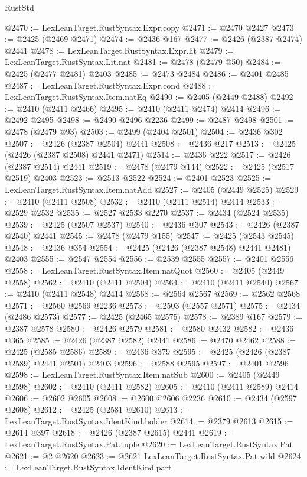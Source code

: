 \begin{lexlean}{RustStd}
\begin{coremodule}
@2470 := LexLeanTarget.RustSyntax.Expr.copy
@2471 := @2470 @2427
@2473 := @2425 (@2469 @2471)
@2474 := @2436 @167
@2477 := @2426 (@2387 @2474) @2441
@2478 := LexLeanTarget.RustSyntax.Expr.lit
@2479 := LexLeanTarget.RustSyntax.Lit.nat
@2481 := @2478 (@2479 @50)
@2484 := @2425 (@2477 @2481) @2403
@2485 := @2473 @2484
@2486 := @2401 @2485
@2487 := LexLeanTarget.RustSyntax.Expr.cond
@2488 := LexLeanTarget.RustSyntax.Item.natEq
@2490 := @2405 (@2449 @2488)
@2492 := @2410 (@2411 @2466)
@2495 := @2410 (@2411 @2474) @2414
@2496 := @2492 @2495
@2498 := @2490 @2496 @2236
@2499 := @2487 @2498
@2501 := @2478 (@2479 @93)
@2503 := @2499 (@2404 @2501)
@2504 := @2436 @302
@2507 := @2426 (@2387 @2504) @2441
@2508 := @2436 @217
@2513 := @2425 (@2426 (@2387 @2508) @2441 @2471)
@2514 := @2436 @222
@2517 := @2426 (@2387 @2514) @2441
@2519 := @2478 (@2479 @144)
@2522 := @2425 (@2517 @2519) @2403
@2523 := @2513 @2522
@2524 := @2401 @2523
@2525 := LexLeanTarget.RustSyntax.Item.natAdd
@2527 := @2405 (@2449 @2525)
@2529 := @2410 (@2411 @2508)
@2532 := @2410 (@2411 @2514) @2414
@2533 := @2529 @2532
@2535 := @2527 @2533 @2270
@2537 := @2434 (@2524 @2535)
@2539 := @2425 (@2507 @2537)
@2540 := @2436 @307
@2543 := @2426 (@2387 @2540) @2441
@2545 := @2478 (@2479 @155)
@2547 := @2425 (@2543 @2545)
@2548 := @2436 @354
@2554 := @2425 (@2426 (@2387 @2548) @2441 @2481) @2403
@2555 := @2547 @2554
@2556 := @2539 @2555
@2557 := @2401 @2556
@2558 := LexLeanTarget.RustSyntax.Item.natQuot
@2560 := @2405 (@2449 @2558)
@2562 := @2410 (@2411 @2504)
@2564 := @2410 (@2411 @2540)
@2567 := @2410 (@2411 @2548) @2414
@2568 := @2564 @2567
@2569 := @2562 @2568
@2571 := @2560 @2569 @2236
@2573 := @2503 (@2557 @2571)
@2575 := @2434 (@2486 @2573)
@2577 := @2425 (@2465 @2575)
@2578 := @2389 @167
@2579 := @2387 @2578
@2580 := @2426 @2579
@2581 := @2580 @2432
@2582 := @2436 @365
@2585 := @2426 (@2387 @2582) @2441
@2586 := @2470 @2462
@2588 := @2425 (@2585 @2586)
@2589 := @2436 @379
@2595 := @2425 (@2426 (@2387 @2589) @2441 @2501) @2403
@2596 := @2588 @2595
@2597 := @2401 @2596
@2598 := LexLeanTarget.RustSyntax.Item.natSub
@2600 := @2405 (@2449 @2598)
@2602 := @2410 (@2411 @2582)
@2605 := @2410 (@2411 @2589) @2414
@2606 := @2602 @2605
@2608 := @2600 @2606 @2236
@2610 := @2434 (@2597 @2608)
@2612 := @2425 (@2581 @2610)
@2613 := LexLeanTarget.RustSyntax.IdentKind.holder
@2614 := @2379 @2613
@2615 := @2614 @397
@2618 := @2426 (@2387 @2615) @2441
@2619 := LexLeanTarget.RustSyntax.Pat.tuple
@2620 := LexLeanTarget.RustSyntax.Pat
@2621 := @2 @2620
@2623 := @2621 LexLeanTarget.RustSyntax.Pat.wild
@2624 := LexLeanTarget.RustSyntax.IdentKind.part

\end{coremodule}
\end{lexlean}
